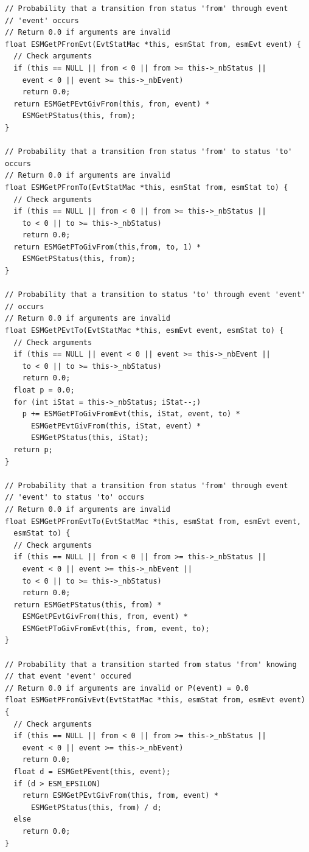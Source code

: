 \documentclass[12pt, a4paper]{article}
\begin{document}
\begin{scriptsize}
\begin{ttfamily}
\begin{lstlisting}
// Probability that a transition from status 'from' through event 
// 'event' occurs
// Return 0.0 if arguments are invalid
float ESMGetPFromEvt(EvtStatMac *this, esmStat from, esmEvt event) {
  // Check arguments
  if (this == NULL || from < 0 || from >= this->_nbStatus ||
    event < 0 || event >= this->_nbEvent) 
    return 0.0;
  return ESMGetPEvtGivFrom(this, from, event) * 
    ESMGetPStatus(this, from);
}

// Probability that a transition from status 'from' to status 'to' occurs
// Return 0.0 if arguments are invalid
float ESMGetPFromTo(EvtStatMac *this, esmStat from, esmStat to) {
  // Check arguments
  if (this == NULL || from < 0 || from >= this->_nbStatus ||
    to < 0 || to >= this->_nbStatus) 
    return 0.0;
  return ESMGetPToGivFrom(this,from, to, 1) * 
    ESMGetPStatus(this, from);
}

// Probability that a transition to status 'to' through event 'event' 
// occurs
// Return 0.0 if arguments are invalid
float ESMGetPEvtTo(EvtStatMac *this, esmEvt event, esmStat to) {
  // Check arguments
  if (this == NULL || event < 0 || event >= this->_nbEvent ||
    to < 0 || to >= this->_nbStatus) 
    return 0.0;
  float p = 0.0;
  for (int iStat = this->_nbStatus; iStat--;)
    p += ESMGetPToGivFromEvt(this, iStat, event, to) * 
      ESMGetPEvtGivFrom(this, iStat, event) * 
      ESMGetPStatus(this, iStat);
  return p;
}

// Probability that a transition from status 'from' through event 
// 'event' to status 'to' occurs
// Return 0.0 if arguments are invalid
float ESMGetPFromEvtTo(EvtStatMac *this, esmStat from, esmEvt event,
  esmStat to) {
  // Check arguments
  if (this == NULL || from < 0 || from >= this->_nbStatus ||
    event < 0 || event >= this->_nbEvent ||
    to < 0 || to >= this->_nbStatus) 
    return 0.0;
  return ESMGetPStatus(this, from) * 
    ESMGetPEvtGivFrom(this, from, event) *
    ESMGetPToGivFromEvt(this, from, event, to);
}

// Probability that a transition started from status 'from' knowing 
// that event 'event' occured
// Return 0.0 if arguments are invalid or P(event) = 0.0 
float ESMGetPFromGivEvt(EvtStatMac *this, esmStat from, esmEvt event) {
  // Check arguments
  if (this == NULL || from < 0 || from >= this->_nbStatus ||
    event < 0 || event >= this->_nbEvent) 
    return 0.0;
  float d = ESMGetPEvent(this, event);
  if (d > ESM_EPSILON)
    return ESMGetPEvtGivFrom(this, from, event) * 
      ESMGetPStatus(this, from) / d;
  else
    return 0.0;
}


\end{lstlisting}
\end{ttfamily}
\end{scriptsize}
\end{document}

